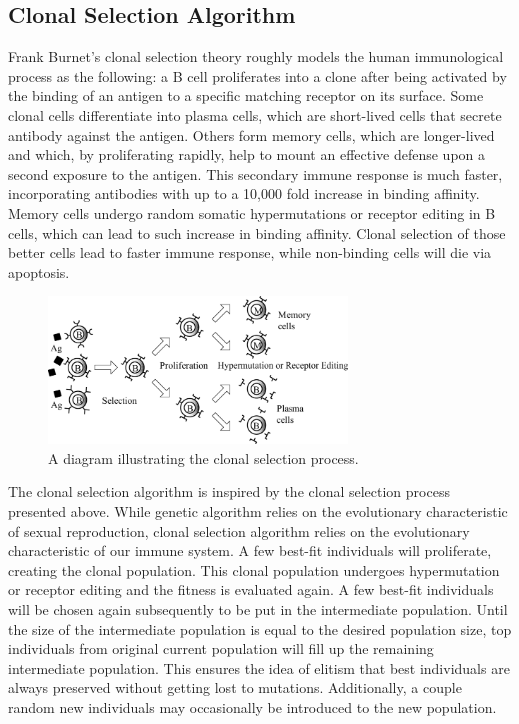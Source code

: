 \documentclass[]{interact}
\theoremstyle{plain} %
\theoremstyle{definition}
\theoremstyle{remark}
\begin{document}
\subsection{Clonal Selection Algorithm}
Frank Burnet's clonal selection theory roughly models the human immunological process as the following: a B cell proliferates into a clone after being activated by the binding of an antigen to a specific matching receptor on its surface. Some clonal cells differentiate into plasma cells, which are short-lived cells that secrete antibody against the antigen. Others form memory cells, which are longer-lived and which, by proliferating rapidly, help to mount an effective defense upon a second exposure to the antigen. \cite{CloND} This secondary immune response is much faster, incorporating antibodies with up to a 10,000 fold increase in binding affinity. \cite{UoA00} Memory cells undergo random somatic hypermutations or receptor editing in B cells, which can lead to such increase in binding affinity. Clonal selection of those better cells lead to faster immune response, while non-binding cells will die via apoptosis.

\begin{figure}[H]
    \centering
    \includegraphics[width=300px]{img/clonal-selection-principle.png}
    \caption{A diagram illustrating the clonal selection process. \cite{Dai07}}
    \label{fig:csp}
\end{figure}

The clonal selection algorithm is inspired by the clonal selection process presented above. While genetic algorithm relies on the evolutionary characteristic of sexual reproduction, clonal selection algorithm relies on the evolutionary characteristic of our immune system. A few best-fit individuals will proliferate, creating the clonal population. This clonal population undergoes hypermutation or receptor editing and the fitness is evaluated again. A few best-fit individuals will be chosen again subsequently to be put in the intermediate population. Until the size of the intermediate population is equal to the desired population size, top individuals from original current population will fill up the remaining intermediate population. This ensures the idea of elitism that best individuals are always preserved without getting lost to mutations. Additionally, a couple random new individuals may occasionally be introduced to the new population.
\end{document}

